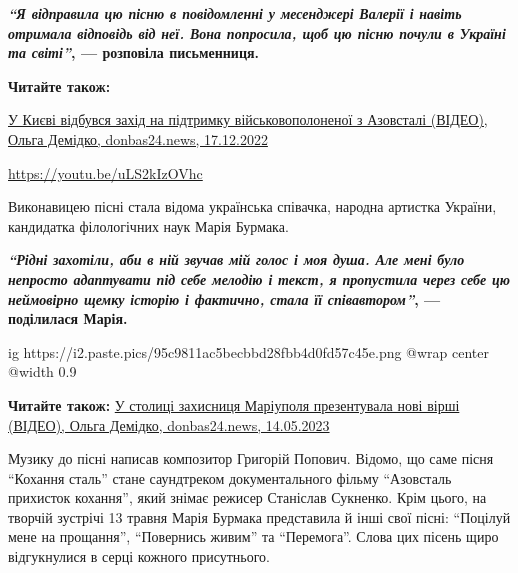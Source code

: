 \begin{leftbar}
	\begingroup
		\bfseries
{\em\color{blue}\enquote{Я відправила цю пісню в повідомленні у месенджері Валерії і навіть
отримала відповідь від неї. Вона попросила, щоб цю пісню почули в
Україні та світі}}, — розповіла письменниця.
	\endgroup
\end{leftbar}

\textbf{Читайте також:} 

\href{https://donbas24.news/news/u-kijevi-vidbuvsya-zaxid-na-pidtrimku-viiskovopolonenoyi-z-azovstali-foto-video}{%
У Києві відбувся захід на підтримку військовополоненої з Азовсталі (ВІДЕО), %
Ольга Демідко, donbas24.news, 17.12.2022}

\url{https://youtu.be/uLS2kIzOVhc}

Виконавицею пісні стала відома українська співачка, народна артистка України,
кандидатка філологічних наук Марія Бурмака. 

\begin{leftbar}
	\begingroup
		\bfseries
		{\em\color{blue}\enquote{Рідні захотіли, аби в ній звучав мій голос і моя душа. Але мені було
непросто адаптувати під себе мелодію і текст, я пропустила через себе цю
неймовірно щемку історію і фактично, стала її співавтором}}, — поділилася Марія.
	\endgroup
\end{leftbar}


\ifcmt
  ig https://i2.paste.pics/95c9811ac5becbbd28fbb4d0fd57c45e.png
  @wrap center
  @width 0.9
\fi


\textbf{Читайте також:} \href{https://donbas24.news/news/u-stolici-zaxisnicya-mariupolya-prezentuvala-novi-virsi}{%
У столиці захисниця Маріуполя презентувала нові вірші (ВІДЕО), Ольга Демідко, donbas24.news, 14.05.2023}

Музику до пісні написав композитор Григорій Попович. Відомо, що саме пісня
\enquote{Кохання сталь} стане саундтреком документального фільму \enquote{Азовсталь прихисток
кохання}, який знімає режисер Станіслав Сукненко. Крім цього, на творчій
зустрічі 13 травня Марія Бурмака представила й інші свої пісні: \enquote{Поцілуй мене
на прощання}, \enquote{Повернись живим} та \enquote{Перемога}. Слова цих пісень щиро
відгукнулися в серці кожного присутнього.


